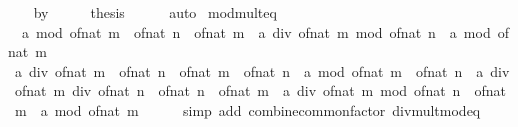 \begin{isabellebody}
\isamarkupfalse%
\isanewline
\ \ \isamarkupfalse%
\ by{}\isanewline
\ \ \isamarkupfalse%
\ \isamarkupfalse%
\ {\isacharquery}{\kern0pt}thesis\isanewline
\ \ \ \ \isamarkupfalse%
\ auto\isanewline
{}\isamarkupfalse%
%
\endisatagproof
{\isafoldproof}%
%
\isadelimproof
\isanewline
%
\endisadelimproof
\isanewline
{}\isamarkupfalse%
\ mod{\isacharunderscore}{\kern0pt}mult{}{\isacharunderscore}{\kern0pt}eq{\isacharprime}{\kern0pt}{\isacharcolon}{\kern0pt}\isanewline
\ \ {\isachardoublequoteopen}a\ mod\ {\isacharparenleft}{\kern0pt}of{\isacharunderscore}{\kern0pt}nat\ m\ {\isacharasterisk}{\kern0pt}\ of{\isacharunderscore}{\kern0pt}nat\ n{\isacharparenright}{\kern0pt}\ {\isacharequal}{\kern0pt}\ of{\isacharunderscore}{\kern0pt}nat\ m\ {\isacharasterisk}{\kern0pt}\ {\isacharparenleft}{\kern0pt}a\ div\ of{\isacharunderscore}{\kern0pt}nat\ m\ mod\ of{\isacharunderscore}{\kern0pt}nat\ n{\isacharparenright}{\kern0pt}\ {\isacharplus}{\kern0pt}\ a\ mod\ of{\isacharunderscore}{\kern0pt}nat\ m{\isachardoublequoteclose}\isanewline
%
\isadelimproof
%
\endisadelimproof
%
\isatagproof
{}\isamarkupfalse%
\ {\isacharminus}{\kern0pt}\isanewline
\ \ \isamarkupfalse%
\ {\isachardoublequoteopen}a\ div\ {\isacharparenleft}{\kern0pt}of{\isacharunderscore}{\kern0pt}nat\ m\ {\isacharasterisk}{\kern0pt}\ of{\isacharunderscore}{\kern0pt}nat\ n{\isacharparenright}{\kern0pt}\ {\isacharasterisk}{\kern0pt}\ {\isacharparenleft}{\kern0pt}of{\isacharunderscore}{\kern0pt}nat\ m\ {\isacharasterisk}{\kern0pt}\ of{\isacharunderscore}{\kern0pt}nat\ n{\isacharparenright}{\kern0pt}\ {\isacharplus}{\kern0pt}\ a\ mod\ {\isacharparenleft}{\kern0pt}of{\isacharunderscore}{\kern0pt}nat\ m\ {\isacharasterisk}{\kern0pt}\ of{\isacharunderscore}{\kern0pt}nat\ n{\isacharparenright}{\kern0pt}\ {\isacharequal}{\kern0pt}\ a\ div\ of{\isacharunderscore}{\kern0pt}nat\ m\ div\ of{\isacharunderscore}{\kern0pt}nat\ n\ {\isacharasterisk}{\kern0pt}\ of{\isacharunderscore}{\kern0pt}nat\ n\ {\isacharasterisk}{\kern0pt}\ of{\isacharunderscore}{\kern0pt}nat\ m\ {\isacharplus}{\kern0pt}\ {\isacharparenleft}{\kern0pt}a\ div\ of{\isacharunderscore}{\kern0pt}nat\ m\ mod\ of{\isacharunderscore}{\kern0pt}nat\ n\ {\isacharasterisk}{\kern0pt}\ of{\isacharunderscore}{\kern0pt}nat\ m\ {\isacharplus}{\kern0pt}\ a\ mod\ of{\isacharunderscore}{\kern0pt}nat\ m{\isacharparenright}{\kern0pt}{\isachardoublequoteclose}\isanewline
\ \ \ \ \isamarkupfalse%
\ {\isacharparenleft}{\kern0pt}simp\ add{\isacharcolon}{\kern0pt}\ combine{\isacharunderscore}{\kern0pt}common{\isacharunderscore}{\kern0pt}factor\ div{\isacharunderscore}{\kern0pt}mult{\isacharunderscore}{\kern0pt}mod{\isacharunderscore}{\kern0pt}eq{\isacharparenright}{\kern0pt}\isanewline

\end{isabellebody}
